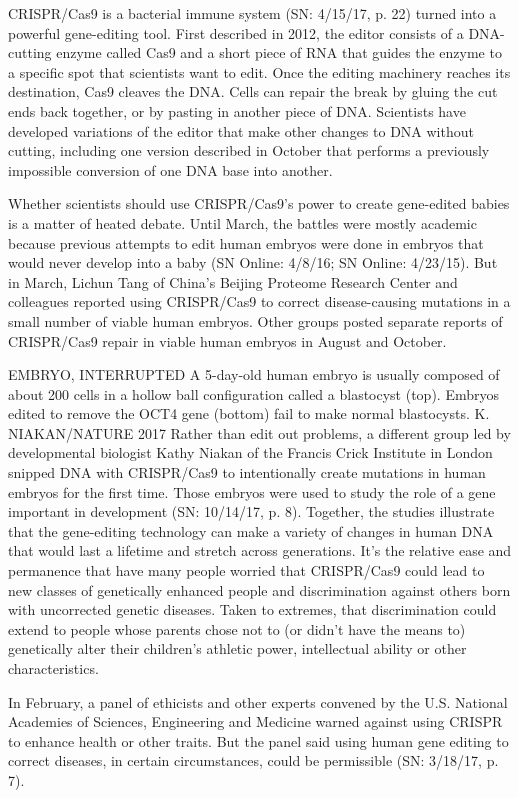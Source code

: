 \documentclass[12pt]{article}
\begin{document}
CRISPR/Cas9 is a bacterial immune system (SN: 4/15/17, p. 22) turned into a powerful gene-editing tool. First described in 2012, the editor consists of a DNA-cutting enzyme called Cas9 and a short piece of RNA that guides the enzyme to a specific spot that scientists want to edit. Once the editing machinery reaches its destination, Cas9 cleaves the DNA. Cells can repair the break by gluing the cut ends back together, or by pasting in another piece of DNA. Scientists have developed variations of the editor that make other changes to DNA without cutting, including one version described in October that performs a previously impossible conversion of one DNA base into another.

Whether scientists should use CRISPR/Cas9’s power to create gene-edited babies is a matter of heated debate. Until March, the battles were mostly academic because previous attempts to edit human embryos were done in embryos that would never develop into a baby (SN Online: 4/8/16; SN Online: 4/23/15). But in March, Lichun Tang of China’s Beijing Proteome Research Center and colleagues reported using CRISPR/Cas9 to correct disease-causing mutations in a small number of viable human embryos. Other groups posted separate reports of CRISPR/Cas9 repair in viable human embryos in August and October.


EMBRYO, INTERRUPTED A 5-day-old human embryo is usually composed of about 200 cells in a hollow ball configuration called a blastocyst (top). Embryos edited to remove the OCT4 gene (bottom) fail to make normal blastocysts.
K. NIAKAN/NATURE 2017
Rather than edit out problems, a different group led by developmental biologist Kathy Niakan of the Francis Crick Institute in London snipped DNA with CRISPR/Cas9 to intentionally create mutations in human embryos for the first time. Those embryos were used to study the role of a gene important in development (SN: 10/14/17, p. 8).
Together, the studies illustrate that the gene-editing technology can make a variety of changes in human DNA that would last a lifetime and stretch across generations. It’s the relative ease and permanence that have many people worried that CRISPR/Cas9 could lead to new classes of genetically enhanced people and discrimination against others born with uncorrected genetic diseases. Taken to extremes, that discrimination could extend to people whose parents chose not to (or didn’t have the means to) genetically alter their children’s athletic power, intellectual ability or other characteristics.

In February, a panel of ethicists and other experts convened by the U.S. National Academies of Sciences, Engineering and Medicine warned against using CRISPR to enhance health or other traits. But the panel said using human gene editing to correct diseases, in certain circumstances, could be permissible (SN: 3/18/17, p. 7).
\end{document}
